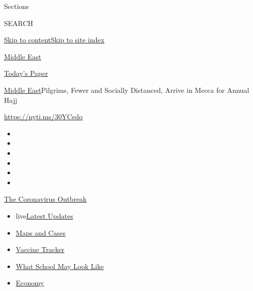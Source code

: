 Sections

SEARCH

\protect\hyperlink{site-content}{Skip to
content}\protect\hyperlink{site-index}{Skip to site index}

\href{https://www.nytimes.com/section/world/middleeast}{Middle East}

\href{https://myaccount.nytimes.com/auth/login?response_type=cookie\&client_id=vi}{}

\href{https://www.nytimes.com/section/todayspaper}{Today's Paper}

\href{/section/world/middleeast}{Middle East}\textbar{}Pilgrims, Fewer
and Socially Distanced, Arrive in Mecca for Annual Hajj

\url{https://nyti.ms/30YCedq}

\begin{itemize}
\item
\item
\item
\item
\item
\item
\end{itemize}

\href{https://www.nytimes.com/news-event/coronavirus?action=click\&pgtype=Article\&state=default\&region=TOP_BANNER\&context=storylines_menu}{The
Coronavirus Outbreak}

\begin{itemize}
\tightlist
\item
  live\href{https://www.nytimes.com/2020/08/01/world/coronavirus-covid-19.html?action=click\&pgtype=Article\&state=default\&region=TOP_BANNER\&context=storylines_menu}{Latest
  Updates}
\item
  \href{https://www.nytimes.com/interactive/2020/us/coronavirus-us-cases.html?action=click\&pgtype=Article\&state=default\&region=TOP_BANNER\&context=storylines_menu}{Maps
  and Cases}
\item
  \href{https://www.nytimes.com/interactive/2020/science/coronavirus-vaccine-tracker.html?action=click\&pgtype=Article\&state=default\&region=TOP_BANNER\&context=storylines_menu}{Vaccine
  Tracker}
\item
  \href{https://www.nytimes.com/interactive/2020/07/29/us/schools-reopening-coronavirus.html?action=click\&pgtype=Article\&state=default\&region=TOP_BANNER\&context=storylines_menu}{What
  School May Look Like}
\item
  \href{https://www.nytimes.com/live/2020/07/31/business/stock-market-today-coronavirus?action=click\&pgtype=Article\&state=default\&region=TOP_BANNER\&context=storylines_menu}{Economy}
\end{itemize}

